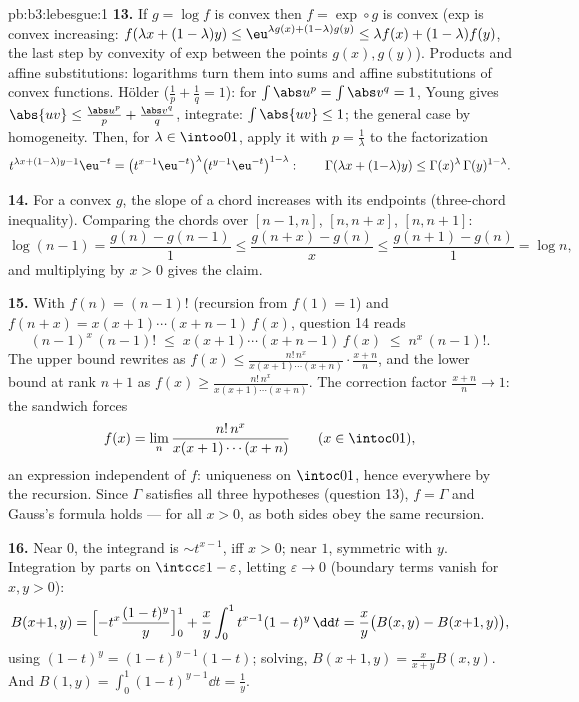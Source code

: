 \begin{solution}{pb:b3:lebesgue:1}
\textbf{13.} If $g = \log f$ is convex then $f = \exp\circ g$
is convex (exp is convex increasing: $f(\lambda x + (1-\lambda)
y) \leq \eu^{\lambda g(x) + (1-\lambda)g(y)} \leq \lambda f(x)
+ (1-\lambda)f(y)$, the last step by convexity of exp between
the points $g(x), g(y)$). Products and affine substitutions:
logarithms turn them into sums and affine substitutions of
convex functions. H\"older ($\frac1p + \frac1q = 1$): for
$\int\abs u^p = \int\abs v^q = 1$, Young gives $\abs{uv} \leq
\frac{\abs u^p}p + \frac{\abs v^q}q$, integrate: $\int\abs{uv}
\leq 1$; the general case by homogeneity. Then, for $\lambda
\in \intoo01$, apply it with $p = \frac1\lambda$ to the
factorization
\[
t^{\lambda x + (1-\lambda)y - 1}\eu^{-t}
= \bigl(t^{x-1}\eu^{-t}\bigr)^{\lambda}
\bigl(t^{y-1}\eu^{-t}\bigr)^{1-\lambda} :
\qquad
\Gamma(\lambda x + (1{-}\lambda)y) \leq
\Gamma(x)^\lambda\,\Gamma(y)^{1-\lambda} .
\]

\textbf{14.} For a convex $g$, the slope of a chord increases
with its endpoints (three-chord inequality). Comparing the
chords over $[n-1, n]$, $[n, n+x]$, $[n, n+1]$:
\[
\log(n-1) = \frac{g(n) - g(n-1)}1 \leq
\frac{g(n+x) - g(n)}x \leq \frac{g(n+1) - g(n)}1 = \log n,
\]
and multiplying by $x > 0$ gives the claim.

\textbf{15.} With $f(n) = (n-1)!$ (recursion from $f(1) = 1$)
and $f(n + x) = x(x+1)\cdots(x+n-1)\,f(x)$, question 14 reads
\[
(n-1)^x\,(n-1)! \;\leq\; x(x+1)\cdots(x+n-1)\,f(x)
\;\leq\; n^x\,(n-1)! .
\]
The upper bound rewrites as $f(x) \leq
\frac{n!\,n^x}{x(x+1)\cdots(x+n)}\cdot\frac{x+n}n$, and the
lower bound at rank $n+1$ as $f(x) \geq
\frac{n!\,n^x}{x(x+1)\cdots(x+n)}$. The correction factor
$\frac{x+n}n \to 1$: the sandwich forces
\[
f(x) = \lim_n\frac{n!\,n^x}{x(x+1)\cdots(x+n)}
\qquad (x \in \intoc01),
\]
an expression independent of $f$: uniqueness on $\intoc01$,
hence everywhere by the recursion. Since $\Gamma$ satisfies
all three hypotheses (question 13), $f = \Gamma$ and Gauss's
formula holds --- for all $x > 0$, as both sides obey the same
recursion.

\textbf{16.} Near $0$, the integrand is $\sim t^{x-1}$,
 iff $x > 0$; near $1$, symmetric with $y$.
Integration by parts on $\intcc\varepsilon{1-\varepsilon}$,
letting $\varepsilon \to 0$ (boundary terms vanish for $x, y >
0$):
\[
B(x{+}1, y) = \Bigl[-t^x\frac{(1-t)^y}y\Bigr]_0^1 +
\frac xy\int_0^1t^{x-1}(1-t)^y\,\dd t
= \frac xy\bigl(B(x, y) - B(x{+}1, y)\bigr),
\]
using $(1-t)^y = (1-t)^{y-1}(1 - t)$; solving, $B(x+1, y) =
\frac{x}{x+y}B(x, y)$. And $B(1, y) =
\int_0^1(1-t)^{y-1}\dd t = \frac1y$.


\end{solution}
